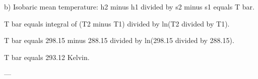 b) Isobaric mean temperature:  
h2 minus h1 divided by s2 minus s1 equals T bar.  

T bar equals integral of (T2 minus T1) divided by ln(T2 divided by T1).  

T bar equals 298.15 minus 288.15 divided by ln(298.15 divided by 288.15).  

T bar equals 293.12 Kelvin.  

---